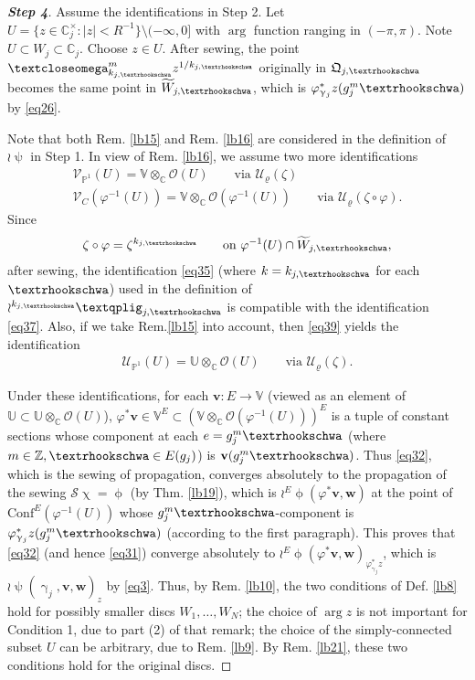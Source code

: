 \documentclass[11pt,b5paper,notitlepage]{article}
\theoremstyle{definition}
\theoremstyle{plain}
\newcommand{\fk}{\mathfrak}
\newcommand{\mc}{\mathcal}
\newcommand{\wtd}{\widetilde}
\newcommand{\Conf}{\mathrm{Conf}}
\newcommand{\scr}{\mathscr}
\newcommand{\Vbb}{\mathbb V}
\newcommand{\Ubb}{\mathbb U}
\newcommand{\Cbb}{\mathbb C}
\newcommand{\Zbb}{\mathbb Z}
\newcommand{\Pbb}{\mathbb P}
\newcommand{\vbf}{\mathbf v}
\newcommand{\wbf}{\mathbf w}
\newcommand{\tipaomega}{\text{\textcloseomega}}
\newcommand{\tipae}{\text{\textrhookschwa}}
\newcommand{\tipxphi}{\text{\textqplig}}
\numberwithin{equation}{subsection}
\begin{document}
\begin{proof}[\textbf{Step 4}] Assume the identifications in Step 2. Let $U=\{z\in\Cbb_j^\times:|z|<R^{-1}\}\setminus (-\infty,0]$ with $\arg$ function ranging in $(-\pi,\pi)$. Note $U\subset W_j\subset\Cbb_j$. Choose $z\in U$. After sewing, the point $\tipaomega_{k_{j,\tipae}}^mz^{1/k_{j,\tipae}}$ originally in $\fk Q_{j,\tipae}$ becomes the same point in $\wtd W_{j,\tipae}$, which is $\varphi^*_{\upgamma_j}z(g_j^m\tipae)$ by \eqref{eq26}. 

Note that both Rem.  \ref{lb15} and Rem. \ref{lb16} are considered in the definition of $\wr\uppsi$ in Step 1. In view of Rem. \ref{lb16}, we assume two more identifications
\begin{gather}
	\scr V_{\Pbb^1}(U)=\Vbb\otimes_\Cbb\scr O(U)	\qquad\text{via }\mc U_\varrho(\zeta)\label{eq39}\\
	\scr V_C(\varphi^{-1}(U))=\Vbb\otimes_\Cbb\scr O(\varphi^{-1}(U))\qquad\text{via }\mc U_\varrho(\zeta\circ\varphi).	\label{eq37}
\end{gather}
Since
\begin{align*}
	\zeta\circ\varphi=\zeta^{k_{j,\tipae}}\qquad\text{on }\varphi^{-1}(U)\cap \wtd W_{j,\tipae},
\end{align*}
after sewing,  the identification \eqref{eq35} (where $k=k_{j,\tipae}$ for each $\tipae$) used in the definition of $\wr^{{k_{j,\tipae}}}\tipxphi_{j,\tipae}$ is compatible with the identification \eqref{eq37}. Also, if we take Rem.\ref{lb15} into account, then \eqref{eq39} yields the identification
\begin{align}
\scr U_{\Pbb^1}(U)=\Ubb\otimes_\Cbb\scr O(U)\qquad\text{via }\mc U_\varrho(\zeta).
\end{align}


Under these identifications, for each $\vbf:E\rightarrow\Vbb$ (viewed as an element of $\Ubb\subset\Ubb\otimes_\Cbb\scr O(U)$),  $\varphi^*\vbf\in\Vbb^E\subset(\Vbb\otimes_\Cbb\scr O(\varphi^{-1}(U)))^E$ is a tuple of constant sections whose component at each $e=g_j^m\tipae$ (where $m\in\Zbb,\tipae\in E(g_j)$) is $\vbf(g_j^m\tipae)$. Thus \eqref{eq32}, which is the sewing of propagation, converges absolutely to the propagation of the sewing $\scr S\upchi=\upphi$ (by Thm. \ref{lb19}), which is $\wr^E\upphi(\varphi^*\vbf,\wbf)$ at the point of $\Conf^E(\varphi^{-1}(U))$ whose $g_j^m\tipae$-component is $\varphi^*_{\upgamma_j}z(g_j^m\tipae)$ (according to the first paragraph). This proves that \eqref{eq32} (and hence \eqref{eq31}) converge absolutely to $\wr^E\upphi(\varphi^*\vbf,\wbf)_{\varphi_{\upgamma_j}^*z}$, which is $\wr\uppsi(\upgamma_j,\vbf,\wbf)_z$ by \eqref{eq3}. Thus, by Rem. \ref{lb10}, the two conditions of Def. \ref{lb8} hold for possibly smaller discs $W_1,\dots,W_N$; the choice of $\arg z$ is not important for Condition 1, due to part (2) of that remark; the choice of the simply-connected subset $U$ can be arbitrary, due to Rem. \ref{lb9}. By Rem. \ref{lb21}, these two conditions hold for the original discs.
\end{proof}
\end{document}
